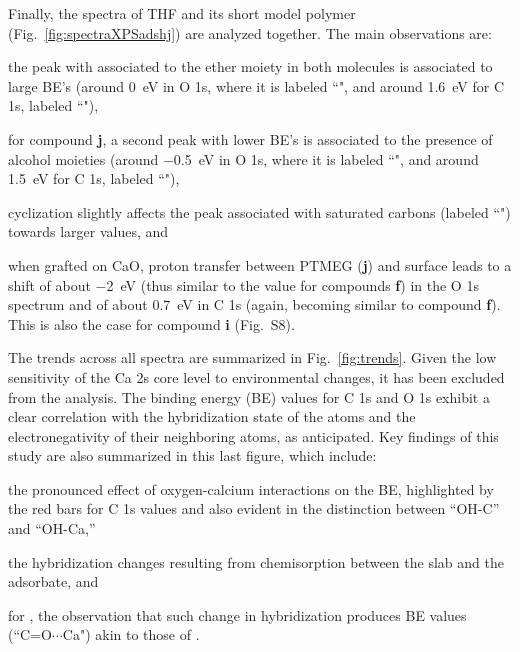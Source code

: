 \documentclass[journal=jpccck,manuscript=article]{achemso}
\begin{document}
\clearpage

Finally, the spectra of THF and its short model polymer (Fig.~\ref{fig:spectraXPSadshj}) are analyzed together. The main observations are: \begin{inparaenum}[(i)]
	\item the peak with associated to the ether moiety in both molecules is associated to large BE's (around \SI{0}{\electronvolt} in O 1s, where it is labeled ``", and around \SI{1.6}{\electronvolt} for C 1s, labeled ``"), 
	\item for compound \textbf{j}, a second peak with lower BE's is associated to the presence of alcohol moieties (around \SI{-0.5}{\electronvolt} in O 1s, where it is labeled ``", and around \SI{1.5}{\electronvolt} for C 1s, labeled ``"), 
	\item cyclization slightly affects the peak associated with saturated carbons (labeled ``") towards larger values, and
	\item when grafted on CaO, proton transfer between PTMEG (\textbf{j}) and surface leads to a shift of about \SI{-2}{\electronvolt}  (thus similar to the value for compounds \textbf{f}) in the O 1s spectrum and of about \SI{0.7}{\electronvolt} in C 1s (again, becoming similar to compound \textbf{f}). This is also the case for compound \textbf{i} (Fig.~S8).
\end{inparaenum}


\clearpage

The trends across all spectra are summarized in Fig.~\ref{fig:trends}. Given the low sensitivity of the Ca 2s core level to environmental changes, it has been excluded from the analysis. The binding energy (BE) values for C 1s and O 1s exhibit a clear correlation with the hybridization state of the atoms and the electronegativity of their neighboring atoms, as anticipated.\cite{stevieIntroductionXrayPhotoelectron2020} 
Key findings of this study are also summarized in this last figure, which include: 
\begin{inparaenum}[(i)]
	\item the pronounced effect of oxygen-calcium interactions on the BE, highlighted by the red bars for C 1s values and also evident in the distinction between ``OH-C'' and ``OH-Ca,'' 
	\item the hybridization changes resulting from chemisorption between the slab and the adsorbate, and 
	\item for , the observation that such change in hybridization produces BE values (``C=O$\cdots$Ca") akin to those of .
\end{inparaenum}
\end{document}
